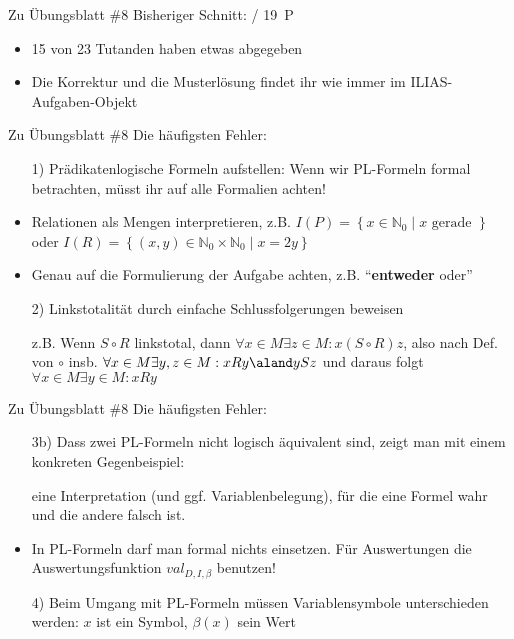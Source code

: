 \begin{frame}{Zu Übungsblatt \#8}
	Bisheriger Schnitt:  / 19~P

	\begin{itemize}[<+->]
		\item 15 von 23 Tutanden haben etwas abgegeben
		\item Die Korrektur und die Musterlösung findet ihr wie immer im ILIAS-Aufgaben-Objekt
	\end{itemize}
\end{frame}

\begin{frame}{Zu Übungsblatt \#8}
	Die häufigsten Fehler:
	\begin{itemize}[<+->]
		\item[1)] Prädikatenlogische Formeln aufstellen: Wenn wir PL-Formeln formal betrachten, müsst ihr auf alle Formalien achten!
		\item Relationen als Mengen interpretieren, z.B. $I(P)=\left\{ x \in \mathbb{N}_0 \middle| x \text{ gerade }\right\}$ oder $I(R)= \left\{(x,y) \in \mathbb{N}_0 \times \mathbb{N}_0 \middle| x = 2y \right\}$
		\item Genau auf die Formulierung der Aufgabe achten, z.B. ``\textbf{entweder} oder''
		\item[2)] Linkstotalität durch einfache Schlussfolgerungen beweisen
		\item[] z.B. Wenn $S\circ R$ linkstotal, dann $\forall x \in M \exists z\in M : x(S\circ R)z$, also nach Def. von $\circ$ insb. $\forall x\in M \exists y,z\in M : xRy \aland ySz$ und daraus folgt $\forall x \in M \exists y \in M : xRy$
	\end{itemize}
\end{frame}

\begin{frame}{Zu Übungsblatt \#8}
	Die häufigsten Fehler:
	\begin{itemize}[<+->]
		\item[3b)] Dass zwei PL-Formeln nicht logisch äquivalent sind, zeigt man mit einem konkreten Gegenbeispiel:
		\item[] eine Interpretation (und ggf. Variablenbelegung), für die eine Formel wahr und die andere falsch ist.
		\item In PL-Formeln darf man formal nichts einsetzen. Für Auswertungen die Auswertungsfunktion $val_{D,I,\beta}$ benutzen!
		\item[4)] Beim Umgang mit PL-Formeln müssen Variablensymbole unterschieden werden: $x$ ist ein Symbol, $\beta(x)$ sein Wert
	\end{itemize}
\end{frame}


